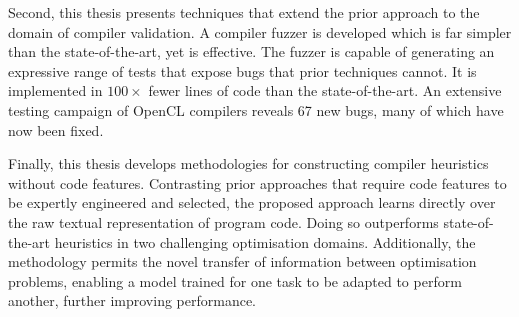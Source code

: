 Second, this thesis presents techniques that extend the prior approach to the domain of compiler validation. A compiler fuzzer is developed which is far simpler than the state-of-the-art, yet is effective. The fuzzer is capable of generating an expressive range of tests that expose bugs that prior techniques cannot. It is implemented in $100\times$ fewer lines of code than the state-of-the-art. An extensive testing campaign of OpenCL compilers reveals 67 new bugs, many of which have now been fixed.

Finally, this thesis develops methodologies for constructing compiler heuristics without code features. Contrasting prior approaches that require code features to be expertly engineered and selected, the proposed approach learns directly over the raw textual representation of program code. Doing so outperforms state-of-the-art heuristics in two challenging optimisation domains. Additionally, the methodology permits the novel transfer of information between optimisation problems, enabling a model trained for one task to be adapted to perform another, further improving performance.
